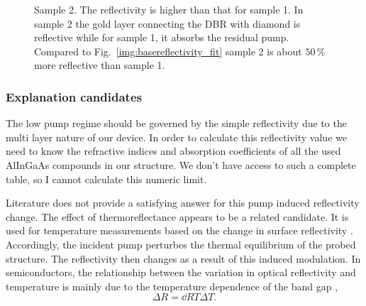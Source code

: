 \begin{figure}
\centering
{}
\caption{Sample 2.
The reflectivity
is higher than that for sample 1.
In sample 2 the gold layer
connecting the DBR with diamond
is reflective
while for sample 1,
it absorbs the residual pump.
Compared to Fig.~\ref{img:basereflectivity_fit}
sample 2 is about $50\,\%$
more reflective than sample 1.}
\label{img:basereflectivity_d6}
\end{figure}


\subsubsection{Explanation candidates}

The low pump regime
should be governed
by the simple reflectivity
due to the multi layer nature
of our device.
In order to calculate
this reflectivity value
we need to know
the refractive indices
and absorption coefficients
of all the used AlInGaAs compounds
in our structure.
We don't have access
to such a complete table,
so I cannot calculate this numeric limit. 

Literature
does not provide
a satisfying answer
for this pump induced reflectivity change.
The effect of thermoreflectance
appears to be a related candidate.
It is used for temperature measurements
based on the change in surface reflectivity
\cite{Epperlein1993,Pierscinski2009}.
Accordingly,
the incident pump
perturbes the thermal equilibrium
of the probed structure.
The reflectivity then changes
as a result of this induced modulation.
In semiconductors,
the relationship
between the variation in
optical reflectivity
and temperature
is mainly due to the temperature dependence
of the band gap \cite{Tessier2001},
\begin{equation}
\Delta R = \dd{R}{T} \Delta T.
\end{equation}

